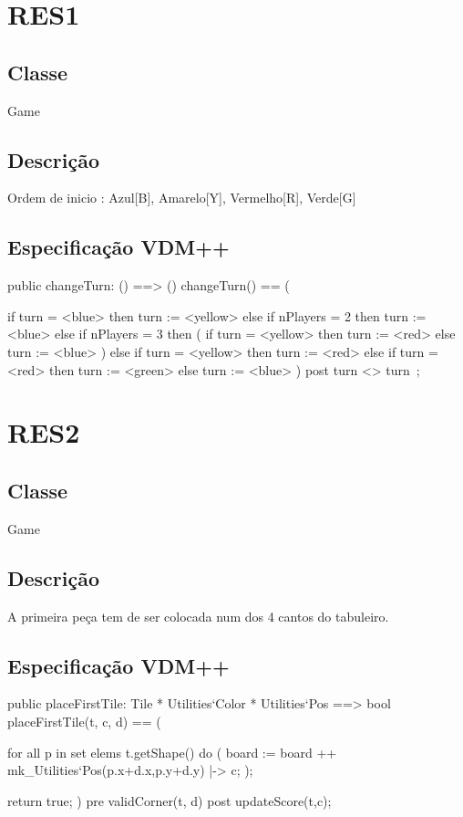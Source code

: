 \section{RES1}
\subsection{Classe}
Game
\subsection{Descrição}
Ordem de inicio : Azul[B], Amarelo[Y], Vermelho[R], Verde[G]
\subsection{Especificação VDM++}
\begin{vdm_al}
public changeTurn: () ==> () 
	changeTurn() == ( 

		  if turn = <blue> then 
		  	turn := <yellow> 
		  else if nPlayers = 2 then 
		      turn := <blue> 
		    else if nPlayers = 3 then ( 
		    	if turn = <yellow> then 
		    		turn := <red> 
				else 
					turn := <blue> 
		    	) 
			else if turn = <yellow> then 
				turn := <red> 
			else if turn = <red> then 
				turn := <green> 
		else 
			turn := <blue>                
	) 
	post turn <> turn~;
\end{vdm_al}

\section{RES2}
\subsection{Classe}
Game
\subsection{Descrição}
A primeira peça tem de ser colocada num dos 4 cantos do tabuleiro.
\subsection{Especificação VDM++}
\begin{vdm_al}
public placeFirstTile: Tile * Utilities`Color * Utilities`Pos ==> bool 
	placeFirstTile(t, c, d) == ( 
		 
			for all p in set elems t.getShape() do (	 
				board := board ++ {mk_Utilities`Pos(p.x+d.x,p.y+d.y) |-> c}; 
			); 

		return true; 
	) 
	pre validCorner(t, d) 
	post updateScore(t,c);
\end{vdm_al}

